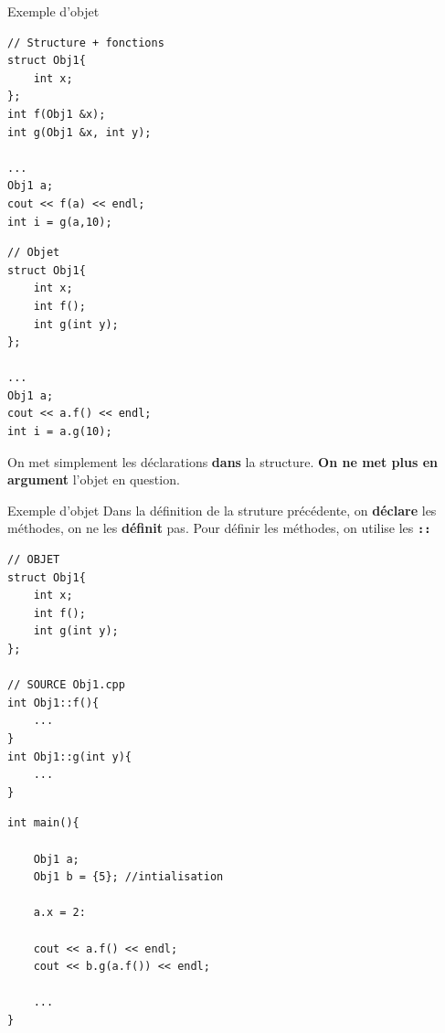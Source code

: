 \begin{frame}[fragile]{Exemple d'objet}
\begin{minipage}{0.43\linewidth}
    
        \begin{verbatim}
// Structure + fonctions
struct Obj1{
    int x;
};
int f(Obj1 &x);
int g(Obj1 &x, int y);

...
Obj1 a;
cout << f(a) << endl;
int i = g(a,10);
        \end{verbatim}
    
\end{minipage}
\hfill
\begin{minipage}{0.43\linewidth}
    
        \begin{verbatim}
// Objet
struct Obj1{
    int x;
    int f();
    int g(int y);
};

...
Obj1 a;
cout << a.f() << endl;
int i = a.g(10);
        \end{verbatim}
    
\end{minipage}

\vspace{0.3cm}
On met simplement les déclarations \textbf{dans} la structure.
\textbf{On ne met plus en argument} l'objet en question.
\end{frame}

\begin{frame}[fragile]{Exemple d'objet}
    Dans la définition de la struture précédente, on \textbf{déclare} les méthodes, on ne les \textbf{définit} pas.
    Pour définir les méthodes, on utilise les \texttt{\textbf{::}}\\
\begin{minipage}{0.43\linewidth}
    
        \begin{verbatim}
// OBJET
struct Obj1{
    int x;
    int f();
    int g(int y);
};

// SOURCE Obj1.cpp
int Obj1::f(){
    ...
}
int Obj1::g(int y){
    ...
}
        \end{verbatim}
    
\end{minipage}
\hfill
\begin{minipage}{0.43\linewidth}
    
        \begin{verbatim}
int main(){

    Obj1 a;
    Obj1 b = {5}; //intialisation

    a.x = 2:

    cout << a.f() << endl;
    cout << b.g(a.f()) << endl;

    ...
}
        \end{verbatim}
    
\end{minipage}
\end{frame}

